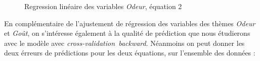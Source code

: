 \documentclass[a4paper,french,10pt]{article}
\begin{document}
\begin{figure}[htp]
{	}%
	\hfill%
	\caption{Regression linéaire des variables \textit{Odeur}, équation 2}
\end{figure}

En complémentaire de l'ajustement de régression des variables des thèmes \textit{Odeur} et \textit{Goût}, on s'intéresse également à la qualité de prédiction que nous étudierons avec le modèle avec \textit{cross-validation~backward}. Néanmoins on peut donner les deux érreurs de prédictions pour les deux équations, sur l'ensemble des données : 


\begin{figure}[htp] 
	\centering
	\hfill%
\end{figure}
\end{document}
